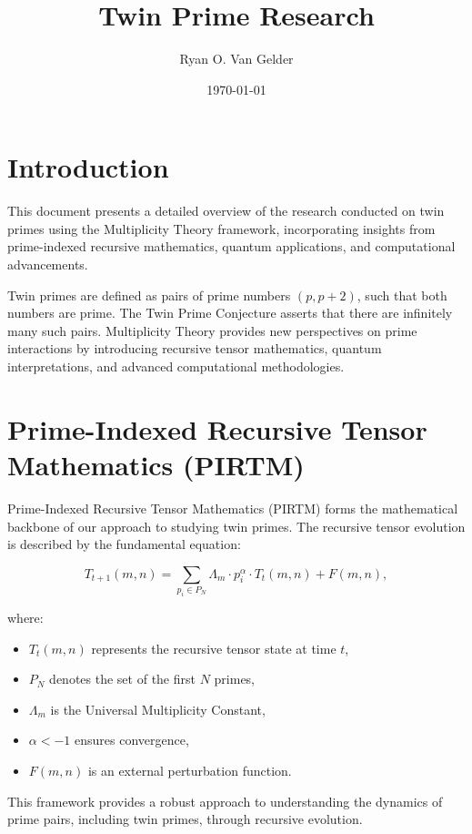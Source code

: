 \documentclass{article}
\theoremstyle{plain}
\theoremstyle{claimstyle}
\begin{document}
\title{Twin Prime Research}
\author{Ryan O. Van Gelder} 
\date{\today}



\maketitle

\section{Introduction}

This document presents a detailed overview of the research conducted on twin primes using the Multiplicity Theory framework, incorporating insights from prime-indexed recursive mathematics, quantum applications, and computational advancements. 

Twin primes are defined as pairs of prime numbers $(p, p+2)$, such that both numbers are prime. The Twin Prime Conjecture asserts that there are infinitely many such pairs. Multiplicity Theory provides new perspectives on prime interactions by introducing recursive tensor mathematics, quantum interpretations, and advanced computational methodologies.

\section{Prime-Indexed Recursive Tensor Mathematics (PIRTM)}

Prime-Indexed Recursive Tensor Mathematics (PIRTM) forms the mathematical backbone of our approach to studying twin primes. The recursive tensor evolution is described by the fundamental equation:

\[
T_{t+1}(m, n) = \sum_{p_i \in P_N} \Lambda_m \cdot p_i^\alpha \cdot T_t(m, n) + F(m, n),
\]

where:
\begin{itemize}
    \item \( T_t(m, n) \) represents the recursive tensor state at time \( t \),
    \item \( P_N \) denotes the set of the first \( N \) primes,
    \item \( \Lambda_m \) is the Universal Multiplicity Constant,
    \item \( \alpha < -1 \) ensures convergence,
    \item \( F(m, n) \) is an external perturbation function.
\end{itemize}

This framework provides a robust approach to understanding the dynamics of prime pairs, including twin primes, through recursive evolution.
\end{document}
